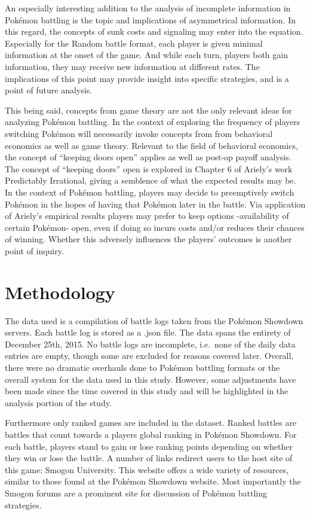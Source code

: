 \documentclass[12pt,twoside]{reedthesis}
\begin{document}
  An especially interesting addition to the analysis of incomplete
  information in Pokémon battling is the topic and implications of
  asymmetrical information. In this regard, the concepts of sunk costs and
  signaling may enter into the equation. Especially for the Random battle
  format, each player is given minimal information at the onset of the
  game. And while each turn, players both gain information, they may
  receive new information at different rates. The implications of this
  point may provide insight into specific strategies, and is a point of
  future analysis.
  
  This being said, concepts from game theory are not the only relevant
  ideas for analyzing Pokémon battling. In the context of exploring the
  frequency of players switching Pokémon will necessarily invoke concepts
  from from behavioral economics as well as game theory. Relevant to the
  field of behavioral economics, the concept of ``keeping doors open''
  applies as well as post-op payoff analysis. The concept of ``keeping
  doors'' open is explored in Chapter 6 of Ariely's work Predictably
  Irrational, giving a semblence of what the expected results may be. In
  the context of Pokémon battling, players may decide to preemptively
  switch Pokémon in the hopes of having that Pokémon later in the battle.
  Via application of Ariely's empirical results players may prefer to keep
  options -availability of certain Pokémon- open, even if doing so incurs
  costs and/or reduces their chances of winning. Whether this adversely
  influences the players' outcomes is another point of inquiry.
  
  \chapter{Methodology}\label{methodology}
  
  The data used is a compilation of battle logs taken from the Pokémon
  Showdown servers. Each battle log is stored as a .json file. The data
  spans the entirety of December 25th, 2015. No battle logs are
  incomplete, i.e.~none of the daily data entries are empty, though some
  are excluded for reasons covered later. Overall, there were no dramatic
  overhauls done to Pokémon battling formats or the overall system for the
  data used in this study. However, some adjustments have been made since
  the time covered in this study and will be highlighted in the analysis
  portion of the study.
  
  Furthermore only ranked games are included in the dataset. Ranked
  battles are battles that count towards a players global ranking in
  Pokémon Showdown. For each battle, players stand to gain or lose ranking
  points depending on whether they win or lose the battle. A number of
  links redirect users to the host site of this game: Smogon University.
  This website offers a wide variety of resources, similar to those found
  at the Pokémon Showdown website. Most importantly the Smogon forums are
  a prominent site for discussion of Pokémon battling strategies.
  
\end{document}
